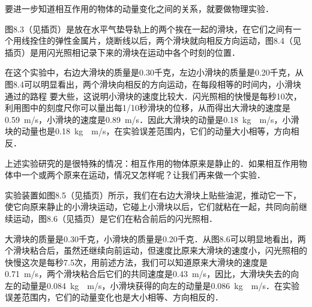 \begin{figure}[H]
    \caption{}
\end{figure}

要进一步知道相互作用的物体的动量变化之间的关系，就要做物理实验．

图8.3（见插页）是放在水平气垫导轨上的两个挨在一起的滑块，在它们之间有一个用线拴住的弹性金属片，烧断线以后，两个滑块就向相反方向运动，图8.4（见插页）是用闪光照相记录下来的滑块在运动中各个时刻的位置．

在这个实验中，右边大滑块的质量是0.30千克，左边小滑块的质量是0.20千克，从图8.4可以明显看出，两个滑块向相反的方向运动，在每段相等的时间内，小滑块通过的路程
要大些，这说明小滑块的速度比较大．闪光照相的快慢是每秒10次，利用图中的刻度尺你可以量出每1/10秒滑块的位移，从而得出大滑块的速度是\qty{0.59}{m/s}，小滑块的速度是\qty{0.89}{m/s}．因此大滑块的动量是\qty{0.18}{kg\cdot m/s}，小滑块的动量也是\qty{0.18}{kg\cdot m/s}，在实验误差范围内，它们的动量大小相等，方向相反．

上述实验研究的是很特殊的情况：相互作用的物体原来是静止的．如果相互作用物体中一个或两个原来在运动，情况又怎样呢？让我们再来做一个实验．

实验装置如图8.5（见插页）所示，我们在右边大滑块上贴些油泥，推动它一下，使它向原来静止的小滑块运动，它碰上小滑块以后，它们就粘在一起，共同向前继续运动，图8.6（见插页）是它们在粘合前后的闪光照相．

大滑块的质量是0.30千克，小滑块的质量是0.20千克．从图8.6可以明显地看出，两个滑块粘合后，虽然还继续向前运动，但速度比原来大滑块的速度小，闪光照相的快慢这次是每秒7.5次，用前述方法，我们可以知道原来大滑块的速度是\qty{0.71}{m/s}，两个滑块粘合后它们的共同速度是\qty{0.43}{m/s}，因比，大滑块失去的向左的动量是\qty{0.084}{kg\cdot m/s}，小滑块获得的向左的动量是\qty{0.086}{kg\cdot m/s}．在实验误差范围内，它们的动量变化也是大小相等、方向相反的．

